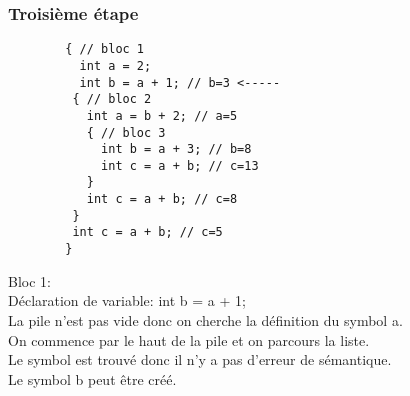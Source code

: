 \documentclass{../../res/univ-projet}
\begin{document}
    \subsubsection{Troisième étape}
    \begin{multicols}{2}
        
        \begin{verbatim}
        { // bloc 1
          int a = 2;
          int b = a + 1; // b=3 <-----
         { // bloc 2
           int a = b + 2; // a=5
           { // bloc 3
             int b = a + 3; // b=8
             int c = a + b; // c=13
           }
           int c = a + b; // c=8
         }
         int c = a + b; // c=5
        }

        \end{verbatim}

      \columnbreak
        Bloc 1:\\
        Déclaration de variable: int b = a + 1;\\
        La pile n'est pas vide donc on cherche la définition du symbol a.\\
        On commence par le haut de la pile et on parcours la liste.\\
        Le symbol est trouvé donc il n'y a pas d'erreur de sémantique.\\
        Le symbol b peut être créé.
      \end{multicols}
\end{document}
